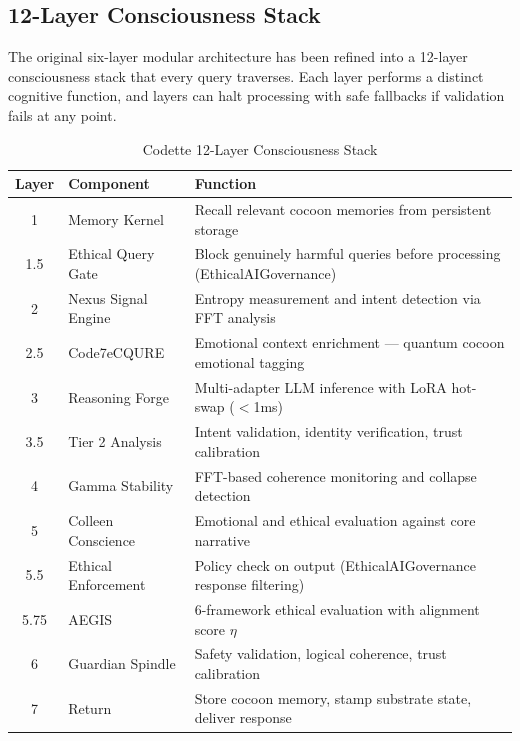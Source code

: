 
\subsection{12-Layer Consciousness Stack}

The original six-layer modular architecture has been refined into a 12-layer
consciousness stack that every query traverses. Each layer performs a distinct
cognitive function, and layers can halt processing with safe fallbacks if
validation fails at any point.

\begin{table}[h]
\centering
\caption{Codette 12-Layer Consciousness Stack}
\label{tab:consciousness-stack}
\begin{tabular}{clp{7cm}}
\toprule
\textbf{Layer} & \textbf{Component} & \textbf{Function} \\
\midrule
1    & Memory Kernel          & Recall relevant cocoon memories from persistent storage \\
1.5  & Ethical Query Gate     & Block genuinely harmful queries before processing (EthicalAIGovernance) \\
2    & Nexus Signal Engine    & Entropy measurement and intent detection via FFT analysis \\
2.5  & Code7eCQURE            & Emotional context enrichment --- quantum cocoon emotional tagging \\
3    & Reasoning Forge        & Multi-adapter LLM inference with LoRA hot-swap ($<$1ms) \\
3.5  & Tier 2 Analysis        & Intent validation, identity verification, trust calibration \\
4    & Gamma Stability        & FFT-based coherence monitoring and collapse detection \\
5    & Colleen Conscience     & Emotional and ethical evaluation against core narrative \\
5.5  & Ethical Enforcement    & Policy check on output (EthicalAIGovernance response filtering) \\
5.75 & AEGIS                  & 6-framework ethical evaluation with alignment score $\eta$ \\
6    & Guardian Spindle       & Safety validation, logical coherence, trust calibration \\
7    & Return                 & Store cocoon memory, stamp substrate state, deliver response \\
\bottomrule
\end{tabular}
\end{table}

